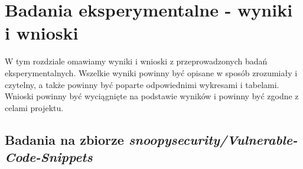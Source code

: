 \chapter{Badania eksperymentalne - wyniki i wnioski}
\label{ch:badania_eksperymentalne}

W tym rozdziale omawiamy wyniki i wnioski z przeprowadzonych badań eksperymentalnych. Wszelkie wyniki powinny być opisane w sposób zrozumiały i czytelny, a także powinny być poparte odpowiednimi wykresami i tabelami. Wnioski powinny być wyciągnięte na podstawie wyników i powinny być zgodne z celami projektu.

\section{Badania na zbiorze \textit{snoopysecurity/Vulnerable-Code-Snippets}}
\label{sec:badania_na_zbiorze_snoopysecurity}
